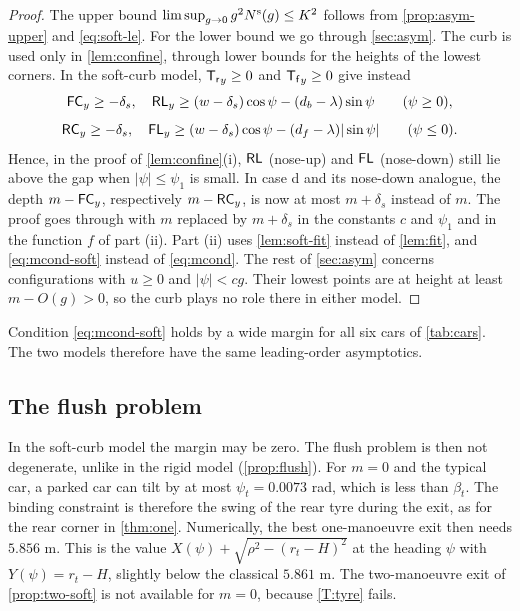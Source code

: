 \begin{proof}
The upper bound $\limsup_{g\to0}g^2N^{\rm s}(g)\le K^2$ follows from \cref{prop:asym-upper} and \eqref{eq:soft-le}.
For the lower bound we go through \cref{sec:asym}.
The curb is used only in \cref{lem:confine}, through lower bounds for the heights of the lowest corners.
In the soft-curb model, $\mathsf{T_r}_y\ge0$ and $\mathsf{T_f}_y\ge0$ give instead
\[
  \mathsf{FC}_y\ge-\delta_s,\quad \mathsf{RL}_y\ge(w-\delta_s)\cos\psi-(d_b-\lambda)\sin\psi\qquad(\psi\ge0),
\]
\[
  \mathsf{RC}_y\ge-\delta_s,\quad \mathsf{FL}_y\ge(w-\delta_s)\cos\psi-(d_f-\lambda)|\sin\psi|\qquad(\psi\le0).
\]
Hence, in the proof of \cref{lem:confine}(i), $\mathsf{RL}$ (nose-up) and $\mathsf{FL}$ (nose-down) still lie above the gap when $|\psi|\le\psi_1$ is small.
In case d and its nose-down analogue, the depth $m-\mathsf{FC}_y$, respectively $m-\mathsf{RC}_y$, is now at most $m+\delta_s$ instead of $m$.
The proof goes through with $m$ replaced by $m+\delta_s$ in the constants $c$ and $\psi_1$ and in the function $f$ of part (ii).
Part (ii) uses \cref{lem:soft-fit} instead of \cref{lem:fit}, and \eqref{eq:mcond-soft} instead of \eqref{eq:mcond}.
The rest of \cref{sec:asym} concerns configurations with $u\ge0$ and $|\psi|<cg$.
Their lowest points are at height at least $m-O(g)>0$, so the curb plays no role there in either model.
\end{proof}

Condition \eqref{eq:mcond-soft} holds by a wide margin for all six cars of \cref{tab:cars}.
The two models therefore have the same leading-order asymptotics.

\subsection{The flush problem}
In the soft-curb model the margin may be zero.
The flush problem is then not degenerate, unlike in the rigid model (\cref{prop:flush}).
For $m=0$ and the typical car, a parked car can tilt by at most $\psi_t=0.0073$ rad, which is less than $\beta_t$.
The binding constraint is therefore the swing of the rear tyre during the exit, as for the rear corner in \cref{thm:one}.
Numerically, the best one-manoeuvre exit then needs $5.856$ m.
This is the value $X(\psi)+\sqrt{\rho^2-(r_t-H)^2}$ at the heading $\psi$ with $Y(\psi)=r_t-H$, slightly below the classical $5.861$ m.
The two-manoeuvre exit of \cref{prop:two-soft} is not available for $m=0$, because \ref{T:tyre} fails.
